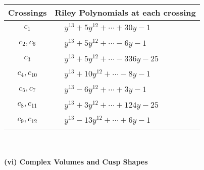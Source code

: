 \documentclass[1p]{elsarticle_modified}
\theoremstyle{definition}
\begin{document}
\begin{tabular}{m{50pt}|m{274pt}}
Crossings & \hspace{64pt}Riley Polynomials at each crossing \\
\hline $$\begin{aligned}c_{1}\end{aligned}$$&$\begin{aligned}
&y^{13}+5 y^{12}+\cdots+30 y-1
\end{aligned}$\\
\hline $$\begin{aligned}c_{2},c_{6}\end{aligned}$$&$\begin{aligned}
&y^{13}+5 y^{12}+\cdots-6 y-1
\end{aligned}$\\
\hline $$\begin{aligned}c_{3}\end{aligned}$$&$\begin{aligned}
&y^{13}+5 y^{12}+\cdots-336 y-25
\end{aligned}$\\
\hline $$\begin{aligned}c_{4},c_{10}\end{aligned}$$&$\begin{aligned}
&y^{13}+10 y^{12}+\cdots-8 y-1
\end{aligned}$\\
\hline $$\begin{aligned}c_{5},c_{7}\end{aligned}$$&$\begin{aligned}
&y^{13}-6 y^{12}+\cdots+3 y-1
\end{aligned}$\\
\hline $$\begin{aligned}c_{8},c_{11}\end{aligned}$$&$\begin{aligned}
&y^{13}+3 y^{12}+\cdots+124 y-25
\end{aligned}$\\
\hline $$\begin{aligned}c_{9},c_{12}\end{aligned}$$&$\begin{aligned}
&y^{13}-13 y^{12}+\cdots+6 y-1
\end{aligned}$\\
\hline
\end{tabular}\\~\\
\newpage\flushleft \textbf{(vi) Complex Volumes and Cusp Shapes}
\end{document}
